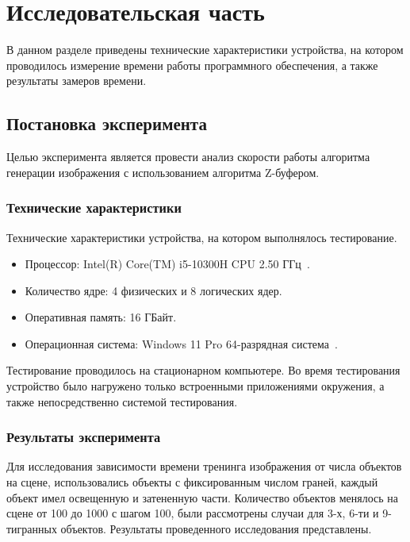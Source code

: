 \section{Исследовательская часть}

В данном разделе приведены технические характеристики устройства, на котором проводилось измерение времени работы программного обеспечения, а также результаты замеров времени.

\subsection{Постановка эксперимента}

Целью эксперимента является провести анализ скорости работы алгоритма генерации изображения с использованием алгоритма Z-буфером.

\subsubsection{Технические характеристики}

Технические характеристики устройства, на котором выполнялось тестирование.
\begin{itemize}
	\item Процессор: Intel(R) Core(TM) i5-10300H CPU 2.50 ГГц~\cite{intel}.
	\item Количество ядре: 4 физических и 8 логических ядер.
	\item Оперативная память: 16 ГБайт.
	\item Операционная система: Windows 11 Pro 64-разрядная система~\cite{windows}.
\end{itemize}

Тестирование проводилось на стационарном компьютере. Во время тестирования устройство было нагружено только встроенными приложениями окружения, а также непосредственно системой тестирования.

\subsubsection{Результаты эксперимента}

Для исследования зависимости времени тренинга изображения от числа объектов на сцене, использовались объекты с фиксированным числом граней, каждый объект имел освещенную и затененную части. Количество объектов менялось на сцене от 100 до 1000 с шагом 100, были рассмотрены случаи для 3-х, 6-ти и 9-тигранных объектов. Результаты проведенного исследования представлены.

